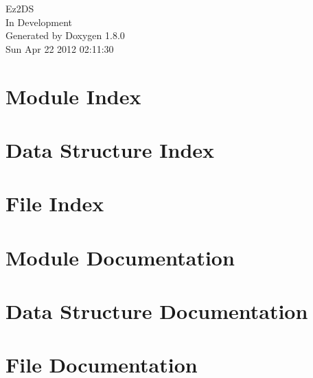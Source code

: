 \documentclass{book}
\begin{document}
\hypersetup{pageanchor=false,citecolor=blue}
\begin{titlepage}
\vspace*{7cm}
\begin{center}
{\Large Ez2\-D\-S \\[1ex]\large In Development }\\
\vspace*{1cm}
{\large Generated by Doxygen 1.8.0}\\
\vspace*{0.5cm}
{\small Sun Apr 22 2012 02:11:30}\\
\end{center}
\end{titlepage}
\clearemptydoublepage
{}
\tableofcontents
\clearemptydoublepage
{}
\hypersetup{pageanchor=true,citecolor=blue}
\chapter{Module Index}

\chapter{Data Structure Index}

\chapter{File Index}

\chapter{Module Documentation}





\chapter{Data Structure Documentation}












\chapter{File Documentation}






\printindex
\end{document}
